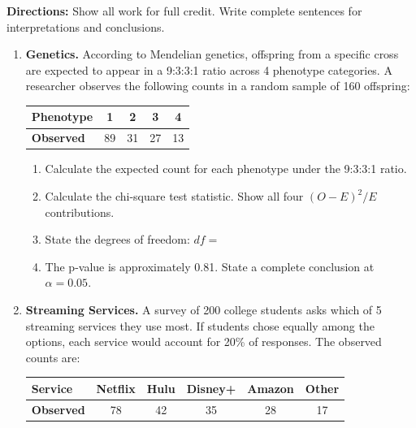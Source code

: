 \documentclass[10pt]{article}
\begin{document}
\namedateperiod

\vspace{0.1in}
\textbf{Directions:} Show all work for full credit. Write complete sentences for
interpretations and conclusions.

\begin{enumerate}

  \item \textbf{Genetics.} According to Mendelian genetics, offspring from a specific
        cross are expected to appear in a 9:3:3:1 ratio across 4 phenotype categories.
        A researcher observes the following counts in a random sample of 160 offspring:

        \renewcommand{\arraystretch}{1.4}
        \begin{center}
        \begin{tabular}{lcccc}
            \textbf{Phenotype} & 1  & 2  & 3  & 4  \\
            \hline
            \textbf{Observed}  & 89 & 31 & 27 & 13 \\
        \end{tabular}
        \end{center}

        \begin{enumerate}[label=\alph*.]
          \item Calculate the expected count for each phenotype under the 9:3:3:1 ratio.
          \item Calculate the chi-square test statistic. Show all four
                $(O - E)^2 / E$ contributions.
          \item State the degrees of freedom: $df =$ \blank{2cm}
          \item The p-value is approximately 0.81. State a complete conclusion at
                $\alpha = 0.05$.
        \end{enumerate}

  \item \textbf{Streaming Services.} A survey of 200 college students asks which of
        5 streaming services they use most. If students chose equally among the options,
        each service would account for 20\% of responses. The observed counts are:

        \renewcommand{\arraystretch}{1.4}
        \begin{center}
        \begin{tabular}{lccccc}
            \textbf{Service}  & Netflix & Hulu & Disney+ & Amazon & Other \\
            \hline
            \textbf{Observed} & 78      & 42   & 35      & 28     & 17    \\
        \end{tabular}
        \end{center}


\end{enumerate}
\end{document}
